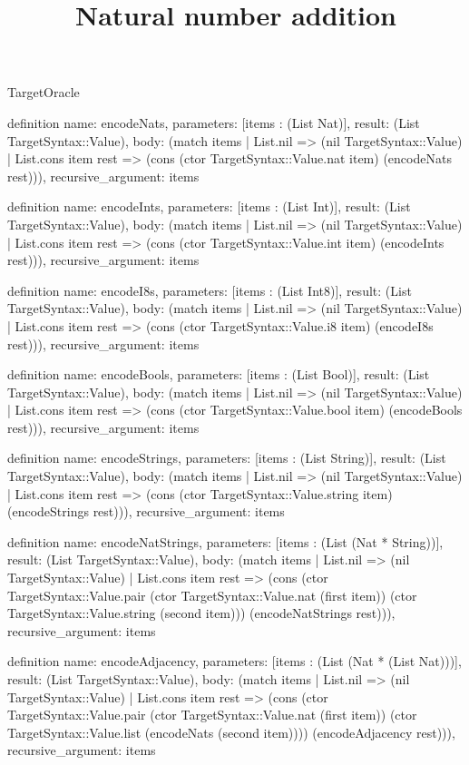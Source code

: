 \begin{lexlean}{TargetOracle}
\title{Natural number addition}
\begin{semanticmodule}
definition{
  name: encodeNats,
  parameters: [items : (List Nat)],
  result: (List TargetSyntax::Value),
  body: (match items
    | List.nil => (nil TargetSyntax::Value)
    | List.cons item rest => (cons (ctor TargetSyntax::Value.nat item) (encodeNats rest))),
  recursive_argument: items
}

definition{
  name: encodeInts,
  parameters: [items : (List Int)],
  result: (List TargetSyntax::Value),
  body: (match items
    | List.nil => (nil TargetSyntax::Value)
    | List.cons item rest => (cons (ctor TargetSyntax::Value.int item) (encodeInts rest))),
  recursive_argument: items
}

definition{
  name: encodeI8s,
  parameters: [items : (List Int8)],
  result: (List TargetSyntax::Value),
  body: (match items
    | List.nil => (nil TargetSyntax::Value)
    | List.cons item rest => (cons (ctor TargetSyntax::Value.i8 item) (encodeI8s rest))),
  recursive_argument: items
}

definition{
  name: encodeBools,
  parameters: [items : (List Bool)],
  result: (List TargetSyntax::Value),
  body: (match items
    | List.nil => (nil TargetSyntax::Value)
    | List.cons item rest => (cons (ctor TargetSyntax::Value.bool item) (encodeBools rest))),
  recursive_argument: items
}

definition{
  name: encodeStrings,
  parameters: [items : (List String)],
  result: (List TargetSyntax::Value),
  body: (match items
    | List.nil => (nil TargetSyntax::Value)
    | List.cons item rest => (cons (ctor TargetSyntax::Value.string item) (encodeStrings rest))),
  recursive_argument: items
}

definition{
  name: encodeNatStrings,
  parameters: [items : (List (Nat * String))],
  result: (List TargetSyntax::Value),
  body: (match items
    | List.nil => (nil TargetSyntax::Value)
    | List.cons item rest => (cons (ctor TargetSyntax::Value.pair (ctor TargetSyntax::Value.nat (first item)) (ctor TargetSyntax::Value.string (second item))) (encodeNatStrings rest))),
  recursive_argument: items
}

definition{
  name: encodeAdjacency,
  parameters: [items : (List (Nat * (List Nat)))],
  result: (List TargetSyntax::Value),
  body: (match items
    | List.nil => (nil TargetSyntax::Value)
    | List.cons item rest => (cons (ctor TargetSyntax::Value.pair (ctor TargetSyntax::Value.nat (first item)) (ctor TargetSyntax::Value.list (encodeNats (second item)))) (encodeAdjacency rest))),
  recursive_argument: items
}
\end{semanticmodule}
\end{lexlean}

